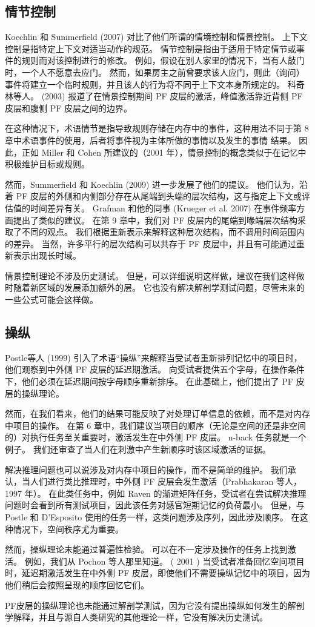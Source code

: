 \subsection{情节控制}
Koechlin 和 Summerfield (2007) 对比了他们所谓的情境控制和情景控制。 上下文控制是指特定上下文对适当动作的规范。 情节控制是指由于适用于特定情节或事件的规则而对该控制进行的修改。 例如，假设在别人家里的情况下，当有人敲门时，一个人不愿意去应门。 然而，如果房主之前曾要求该人应门，则此（询问）事件将建立一个临时规则，并且该人的行为将不同于上下文本身所规定的。 科奇林等人。 (2003) 报道了在情景控制期间 PF 皮层的激活，峰值激活靠近背侧 PF 皮层和腹侧 PF 皮层之间的边界。
\par 
在这种情况下，术语情节是指导致规则存储在内存中的事件，这种用法不同于第 8 章中术语事件的使用，后者将事件视为主体所做的事情以及发生的事情 结果。 因此，正如 Miller 和 Cohen 所建议的（2001 年），情景控制的概念类似于在记忆中积极维护目标或规则。
\par 
然而，Summerfield 和 Koechlin (2009) 进一步发展了他们的提议。 他们认为，沿着 PF 皮层的外侧和内侧部分存在从尾端到头端的层次结构，这与指定上下文或评估值的时间差异有关。 Grafman 和他的同事 (Krueger et al. 2007) 在事件频率方面提出了类似的建议。 在第 9 章中，我们对 PF 皮层内的尾端到喙端层次结构采取了不同的观点。 我们根据重新表示来解释这种层次结构，而不调用时间范围内的差异。 当然，许多平行的层次结构可以共存于 PF 皮层中，并且有可能通过重新表示出现长时域。
\par 
情景控制理论不涉及历史测试。 但是，可以详细说明这样做，建议在我们这样做时随着新区域的发展添加额外的层。 它也没有解决解剖学测试问题，尽管未来的一些公式可能会这样做。
\subsection{操纵}
Postle等人 (1999) 引入了术语“操纵”来解释当受试者重新排列记忆中的项目时，他们观察到中外侧 PF 皮层的延迟期激活。 向受试者提供五个字母，在操作条件下，他们必须在延迟期间按字母顺序重新排序。 在此基础上，他们提出了 PF 皮层的操纵理论。
\par 
然而，在我们看来，他们的结果可能反映了对处理订单信息的依赖，而不是对内存中项目的操作。 在第 6 章中，我们建议当项目的顺序（无论是空间的还是非空间的）对执行任务至关重要时，激活发生在中外侧 PF 皮层。 n-back 任务就是一个例子。 我们还审查了当人们在刺激中产生新顺序时该区域激活的证据。
\par 
解决推理问题也可以说涉及对内存中项目的操作，而不是简单的维护。 我们承认，当人们进行类比推理时，中外侧 PF 皮层会发生激活（Prabhakaran 等人，1997 年）。 在此类任务中，例如 Raven 的渐进矩阵任务，受试者在尝试解决推理问题时会看到所有测试项目，因此该任务对感官短期记忆的负荷最小。 但是，与 Postle 和 D'Esposito 使用的任务一样，这类问题涉及序列，因此涉及顺序。 在这种情况下，空间秩序尤为重要。
\par 
然而，操纵理论未能通过普遍性检验。 可以在不一定涉及操作的任务上找到激活。 例如，我们从 Pochon 等人那里知道。 ( 2001 ) 当受试者准备回忆空间项目时，延迟期激活发生在中外侧 PF 皮层，即使他们不需要操纵记忆中的项目，因为他们稍后会按照呈现的顺序回忆它们。
\par 
PF皮层的操纵理论也未能通过解剖学测试，因为它没有提出操纵如何发生的解剖学解释，并且与源自人类研究的其他理论一样，它没有解决历史测试。
